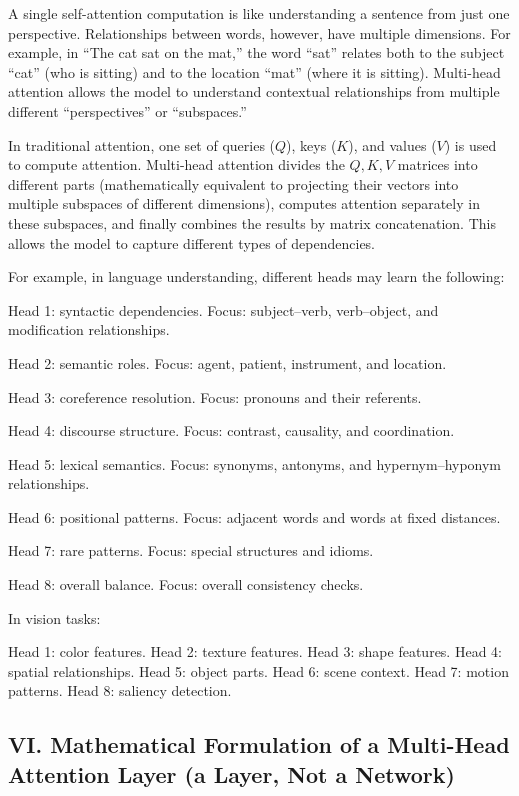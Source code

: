 A single self-attention computation is like understanding a sentence from just one perspective. Relationships between words, however, have multiple dimensions. For example, in ``The cat sat on the mat,'' the word ``sat'' relates both to the subject ``cat'' (who is sitting) and to the location ``mat'' (where it is sitting). Multi-head attention allows the model to understand contextual relationships from multiple different ``perspectives'' or ``subspaces.''

In traditional attention, one set of queries (\(Q\)), keys (\(K\)), and values (\(V\)) is used to compute attention. Multi-head attention divides the \(Q,K,V\) matrices into different parts (mathematically equivalent to projecting their vectors into multiple subspaces of different dimensions), computes attention separately in these subspaces, and finally combines the results by matrix concatenation. This allows the model to capture different types of dependencies.

For example, in language understanding, different heads may learn the following:

Head 1: syntactic dependencies. Focus: subject--verb, verb--object, and modification relationships.

Head 2: semantic roles. Focus: agent, patient, instrument, and location.

Head 3: coreference resolution. Focus: pronouns and their referents.

Head 4: discourse structure. Focus: contrast, causality, and coordination.

Head 5: lexical semantics. Focus: synonyms, antonyms, and hypernym--hyponym relationships.

Head 6: positional patterns. Focus: adjacent words and words at fixed distances.

Head 7: rare patterns. Focus: special structures and idioms.

Head 8: overall balance. Focus: overall consistency checks.

In vision tasks:

Head 1: color features. Head 2: texture features. Head 3: shape features. Head 4: spatial relationships. Head 5: object parts. Head 6: scene context. Head 7: motion patterns. Head 8: saliency detection.

\hypertarget{vi.-mathematical-formulation-of-a-multi-head-attention-layer-a-layer-not-a-network}{%
\subsection{VI. Mathematical Formulation of a Multi-Head Attention Layer (a Layer, Not a Network)}\label{vi.-mathematical-formulation-of-a-multi-head-attention-layer-a-layer-not-a-network}}

